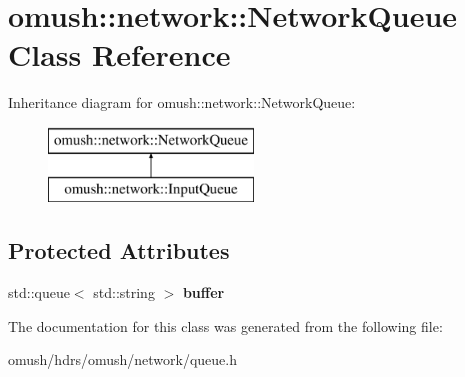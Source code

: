 \hypertarget{classomush_1_1network_1_1_network_queue}{\section{omush\-:\-:network\-:\-:Network\-Queue Class Reference}
\label{classomush_1_1network_1_1_network_queue}
}
Inheritance diagram for omush\-:\-:network\-:\-:Network\-Queue\-:\begin{figure}[H]
\begin{center}
\leavevmode
\includegraphics[height=2.000000cm]{classomush_1_1network_1_1_network_queue}
\end{center}
\end{figure}
\subsection*{Protected Attributes}
\begin{DoxyCompactItemize}
\item 
\hypertarget{classomush_1_1network_1_1_network_queue_ab8d842e2bd38568aff6d756ab56a4c7f}{std\-::queue$<$ std\-::string $>$ {\bfseries buffer}}\label{classomush_1_1network_1_1_network_queue_ab8d842e2bd38568aff6d756ab56a4c7f}

\end{DoxyCompactItemize}


The documentation for this class was generated from the following file\-:\begin{DoxyCompactItemize}
\item 
omush/hdrs/omush/network/queue.\-h\end{DoxyCompactItemize}
